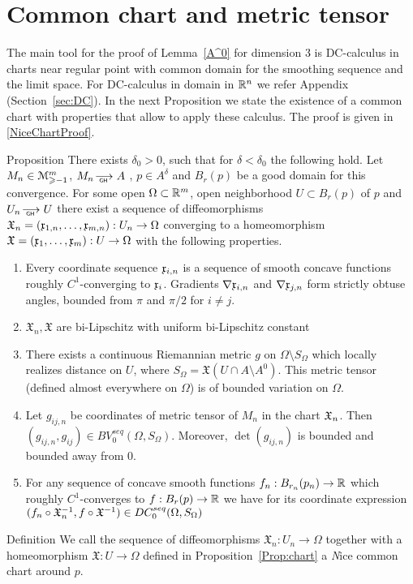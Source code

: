
\section{Common chart and metric tensor}

The main tool for the proof
of Lemma~\ref{A^0} for dimension 3
is DC-calculus in  charts near regular point
with common domain for the smoothing sequence and the
limit space. For DC-calculus in domain in $\mathbb{R}^n$
we refer Appendix (Section~\ref{sec:DC}).
In the next Proposition we 
state the existence of a common chart with 
properties that allow to apply these calculus.
The proof is given in \ref{NiceChartProof}.

\begin{thm}{ Proposition}\label{Prop:chart}
	There exists $\delta_0>0$, such that for $\delta<\delta_0$
	the following hold.	
	Let   
	$M_n\in\mathcal M_{\geqslant -1}^m$,
	$M_n\GHto A$ , $ p\in A^\delta$
	and $B_r (p)$
	be a good domain for this convergence.
	For some open
	$\Omega\subset \mathbb{R}^m$, open 
	neighborhood $U\subset B_r (p)$ of $p$
	and $U_n\GHto U$ 
	there exist a
	sequence of
	diffeomorphisms $\mathfrak X_n=(\mathfrak x_{1,n},\dots,\mathfrak x_{m,n}):U_n\to\Omega$
	converging to a homeomorphism 	$\mathfrak X=(\mathfrak x_{1},\dots,\mathfrak x_{m}):U\to\Omega$ with 
	the following properties.
	
	\begin{enumerate}[label=\alph*. ]
	
	\item\label{obtuse}

 Every coordinate sequence $\mathfrak x_{i,n}$ is a sequence of smooth concave functions roughly $C^1$-converging to $\mathfrak x_i$. Gradients
	$\nabla\mathfrak x_{i,n}$ and $\nabla\mathfrak x_{j,n}$ form strictly obtuse angles,
	bounded from $\pi$ and $\pi/2$ for
	$i\neq j$. 
	\item $\mathfrak X_n, \mathfrak X$ are bi-Lipschitz 
	with uniform  bi-Lipschitz 
	constant
	
\item\label{metric} 
	There exists a continuous Riemannian metric
	$g$ on $\Omega\setminus S_\Omega$ which locally 
	realizes distance on $U$, where
	$S_\Omega=\mathfrak X(U\cap A\setminus A^0)$.
	This metric tensor 
	(defined almost everywhere on $\Omega$)
	is of bounded variation
	on $\Omega$. 
	
\item\label{metricseq}
	Let $g_{ij,n}$ be coordinates of metric tensor of $M_n$ 
	in the chart $\mathfrak X_n$. 
	Then
	$(g_{ij,n}, g_{ij})\in BV_0^{seq}(\Omega, S_\Omega)$.
	Moreover, $\det(g_{ij,n})$ is bounded and bounded away from 0.
	
	
	\item\label{funktioninchart}
	For any
	sequence
	of concave smooth functions
	$f_n:B_{r_n}(p_n)\to\mathbb{R}$ 
	which roughly $C^1$-converges to  $f:B_r(p )\to\mathbb{R}$ we have for its coordinate
	expression
	$(f_n\circ\mathfrak X_n^{-1}, f\circ\mathfrak X^{-1})\in DC_0^{seq}(\Omega, S_\Omega)$
	
	\end{enumerate}
\end{thm}

\begin{thm}{Definition}
	We call the sequence of
	diffeomorphisms $\mathfrak X_n:U_n\to\Omega$
	together with a homeomorphism 	$\mathfrak X:U\to\Omega$
	defined in
Proposition~\ref{Prop:chart}
a {\emph Nice common chart} around $p$.

\end{thm}
